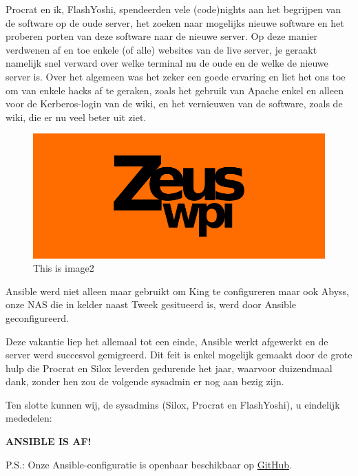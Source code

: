 \documentclass{article}
\begin{document}
Procrat en ik, FlashYoshi, spendeerden vele (code)nights aan het begrijpen van de software op de oude server, het zoeken naar mogelijks nieuwe software en het proberen porten van deze software naar de nieuwe server.
Op deze manier verdwenen af en toe enkele (of alle) websites van de live server, je geraakt namelijk snel verward over welke terminal nu de oude en de welke de nieuwe server is.
Over het algemeen was het zeker een goede ervaring en liet het ons toe om van enkele hacks af te geraken, zoals het gebruik van Apache enkel en alleen voor de Kerberos-login van de wiki, en het vernieuwen van de software, zoals de wiki, die er nu veel beter uit ziet.

\begin{minipage}{0.5\textwidth}
\begin{figure}[H]
\includegraphics[width=\textwidth]{image2.png}
\caption{This is image2}
\end{figure}
\end{minipage} \hfill
\begin{minipage}{0.45\textwidth}
Ansible werd niet alleen maar gebruikt om King te configureren maar ook Abyss, onze NAS die in kelder naast Tweek gesitueerd is, werd door Ansible geconfigureerd.
\end{minipage}

Deze vakantie liep het allemaal tot een einde, Ansible werkt afgewerkt en de server werd succesvol gemigreerd. \newline
Dit feit is enkel mogelijk gemaakt door de grote hulp die Procrat en Silox leverden gedurende het jaar, waarvoor duizendmaal dank, zonder hen zou de volgende sysadmin er nog aan bezig zijn.

Ten slotte kunnen wij, de sysadmins (Silox, Procrat en FlashYoshi), u eindelijk mededelen:

\textbf{ANSIBLE IS AF!}

{\small P.S.: Onze Ansible-configuratie is openbaar beschikbaar op \href{https://zeus.ugent.be/git/ansible-config}{GitHub}.}
\end{document}
